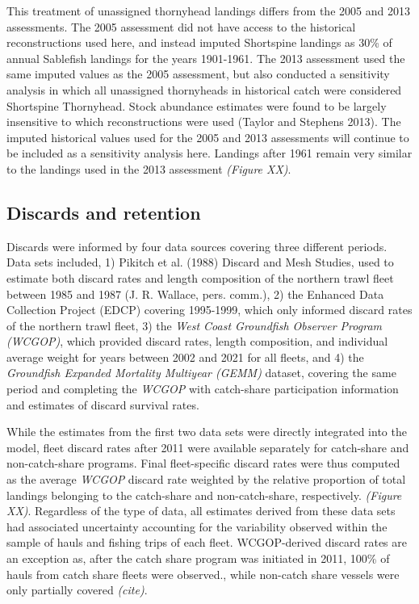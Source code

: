 \documentclass[11pt,
  english,
  letterpaper,
]{article}
\begin{document}
This treatment of unassigned thornyhead landings differs from the 2005 and 2013 assessments. The 2005 assessment did not have access to the historical reconstructions used here, and instead imputed Shortspine landings as 30\% of annual Sablefish landings for the years 1901-1961. The 2013 assessment used the same imputed values as the 2005 assessment, but also conducted a sensitivity analysis in which all unassigned thornyheads in historical catch were considered Shortspine Thornyhead. Stock abundance estimates were found to be largely insensitive to which reconstructions were used (Taylor and Stephens 2013). The imputed historical values used for the 2005 and 2013 assessments will continue to be included as a sensitivity analysis here. Landings after 1961 remain very similar to the landings used in the 2013 assessment \emph{\emph{(Figure XX)}}.

\hypertarget{discards-and-retention}{%
\subsection{Discards and retention}\label{discards-and-retention}}

Discards were informed by four data sources covering three different periods. Data sets included, 1) Pikitch et al. (1988) Discard and Mesh Studies, used to estimate both discard rates and length composition of the northern trawl fleet between 1985 and 1987 (J. R. Wallace, pers. comm.), 2) the Enhanced Data Collection Project (EDCP) covering 1995-1999, which only informed discard rates of the northern trawl fleet, 3) the \emph{West Coast Groundfish Observer Program (WCGOP)}, which provided discard rates, length composition, and individual average weight for years between 2002 and 2021 for all fleets, and 4) the \emph{Groundfish Expanded Mortality Multiyear (GEMM)} dataset, covering the same period and completing the \emph{WCGOP} with catch-share participation information and estimates of discard survival rates.

While the estimates from the first two data sets were directly integrated into the model, fleet discard rates after 2011 were available separately for catch-share and non-catch-share programs. Final fleet-specific discard rates were thus computed as the average \emph{WCGOP} discard rate weighted by the relative proportion of total landings belonging to the catch-share and non-catch-share, respectively. \emph{\emph{(Figure XX)}}. Regardless of the type of data, all estimates derived from these data sets had associated uncertainty accounting for the variability observed within the sample of hauls and fishing trips of each fleet. WCGOP-derived discard rates are an exception as, after the catch share program was initiated in 2011, 100\% of hauls from catch share fleets were observed., while non-catch share vessels were only partially covered \emph{\emph{(cite)}}.
\end{document}
